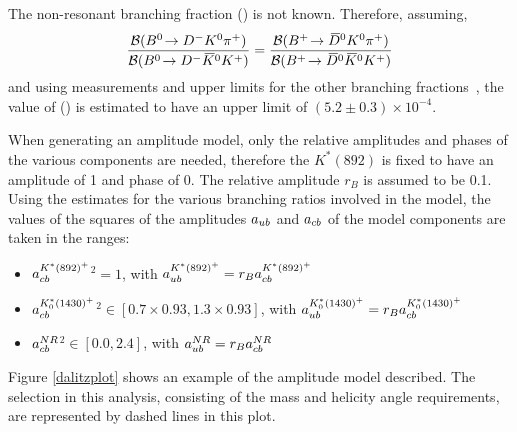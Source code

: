 The non-resonant branching fraction \BR(\decay{\Bp}{\Dzb\KS\pip}) is not known. Therefore, assuming,
\begin{equation*}
\frac{{\mathcal{B}}({{B}^0}\!\rightarrow {\ensuremath{{D}^-}}{\ensuremath{{K}^0}}{\ensuremath{{\pi}^+}})}{{\mathcal{B}}({{B}^0}\!\rightarrow {\ensuremath{{D}^-}}{\ensuremath{{\kern 0.2em\overline{\kern -0.2em K}{}}{}^0}}{\ensuremath{{K}^+}})} = \frac{{\mathcal{B}}({{{B}^+}}\!\rightarrow {\ensuremath{{\kern 0.2em\overline{\kern -0.2em D}{}}{}^0}}{\ensuremath{{K}^0}}{\ensuremath{{\pi}^+}})}{{\mathcal{B}}({{{B}^+}}\!\rightarrow {\ensuremath{{\kern 0.2em\overline{\kern -0.2em D}{}}{}^0}}{\ensuremath{{\kern 0.2em\overline{\kern -0.2em K}{}}{}^0}}{\ensuremath{{K}^+}})}
\end{equation*}
and using measurements and upper limits for the other branching fractions~\cite{PDG2014}, the value of \BR(\decay{\Bp}{\Dzb\KS\pip}) is estimated to have an upper limit of $(5.2 \pm 0.3) \times 10^{-4}$.

When generating an amplitude model, only the relative amplitudes and phases of the various components are needed, therefore the $K^*(892)$ is fixed to have an amplitude of 1 and phase of 0. The relative amplitude $r_B$ is assumed to be 0.1. Using the estimates for the various branching ratios involved in the model, the values of the squares of the amplitudes $a_{{u}{b}}$ and $a_{{c}{b}}$ of the model components are taken in the ranges:

\begin{itemize}
\item \textbar $a_{{c}{b}}^{K^*(892)^+}$\textbar$^2 = 1$, \hspace{12pt} with $a_{{u}{b}}^{K^*(892)^+} = r_B a_{{c}{b}}^{K^*(892)^+}$
\item \textbar $a_{{c}{b}}^{K^*_0(1430)^+}$\textbar$^2 \in [0.7 \times 0.93,1.3 \times 0.93]$, \hspace{14pt} with $a_{{u}{b}}^{K^*_0(1430)^+} = r_B a_{{c}{b}}^{K^*_0(1430)^+}$
\item \textbar $a_{{c}{b}}^{NR}$\textbar$^2 \in [0.0,2.4]$, \hspace{12pt} with $a_{{u}{b}}^{NR} = r_B a_{{c}{b}}^{NR}$
\end{itemize}

%

Figure \ref{dalitzplot} shows an example of the amplitude model described. The \Kstar selection in this analysis, consisting of the \Kstar mass and \KS helicity angle requirements, are represented by dashed lines in this plot.

